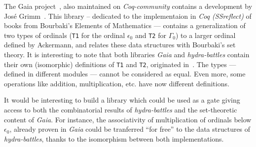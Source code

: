 \documentclass{easychair}
\begin{document}
The Gaia project~\cite{Gaia}, also maintained on \textit{Coq-community} contains a development by José Grimm~\cite{grimm:hal-00911710}. This library -- dedicated  to the implementaion in \textit{Coq (SSreflect)} of books from  Bourbaki's Elements of Mathematics --- contains a generalization of two types of ordinals (\texttt{T1} for the ordinal $\epsilon_0$ and
\texttt{T2} for $\Gamma_0$) to a larger ordinal defined by Ackermann, and relates these data structures with Bourbaki's set theory.
It is interesting to note that both libraries \textit{Gaia} and \textit{hydra-battles} contain their own (isomorphic) definitions of
\texttt{T1} and \texttt{T2}, originated in~\cite{CantorContrib}.
The types --- defined in different modules --- cannot be considered as equal. Even more, some operations like addition, multiplication, etc. have now different definitions.

It would be interesting to build a library which could be used as a gate giving access to both the combinatorial results of \textit{hydra-battles} and the set-theoretic content of \textit{Gaia}.
For instance, the associativity of multiplication of ordinals below $\epsilon_0$, already proven in \textit{Gaia} could be tranferred ``for free'' to the data structures of \textit{hydra-battles}, thanks to the isomorphism between both implementations.






\label{sect:bib}

%
%
%

\end{document}
